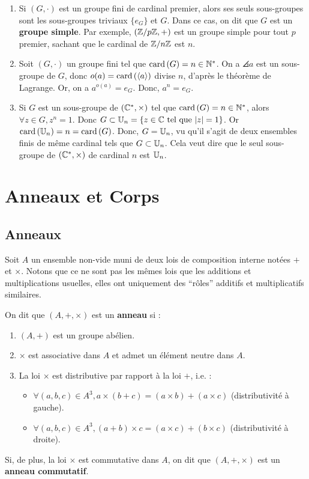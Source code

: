 \documentclass[12pt, a4paper]{report}
\begin{document}
\begin{consequence}
    \begin{enumerate}
        \item Si $(G,\cdot)$ est un groupe fini de cardinal premier, alors ses seuls sous-groupes sont les sous-groupes triviaux $\{e_G\}$ et $G$. Dans ce cas, on dit que $G$ est un \textbf{groupe simple}. Par exemple, $(\mathbb{Z}/p\mathbb{Z},+)$ est un groupe simple pour tout $p$ premier, sachant que le cardinal de $\mathbb{Z}/n\mathbb{Z}$ est $n$.
        \item Soit $(G,\cdot)$ un groupe fini tel que $\mathrm{card}\left(G\right)=n\in\mathbb{N}^*$. On a $\angles{a}$ est un sous-groupe de $G$, donc $o(a)=\mathrm{card}\left(\left\langle a\right\rangle\right)$ divise $n$, d'après le théorème de Lagrange. Or, on a $a^{o(a)}=e_G$. Donc, $a^n = e_G$.
        \item Si $G$ est un sous-groupe de $(\mathbb{C}^*,\times)$ tel que $\mathrm{card}\left(G\right)=n\in\mathbb{N}^*$, alors $\forall z \in G, z^n = 1$. Donc $G\subset \mathbb{U}_n = \{z \in \mathbb{C} \text{ tel que } |z|=1\}$. Or $\mathrm{card}\left(\mathbb{U}_n\right) = n = \mathrm{card}\left(G\right)$. Donc, $G = \mathbb{U}_n$, vu qu'il s'agit de deux ensembles finis de même cardinal tels que $G \subset \mathbb{U}_n$. Cela veut dire que le seul sous-groupe de $(\mathbb{C}^*,\times)$ de cardinal $n$ est $\mathbb{U}_n$.
    \end{enumerate}
\end{consequence}

\chapter{Anneaux et Corps}

\section{Anneaux}

\begin{definition}[Anneau]
    Soit $A$ un ensemble non-vide muni de deux lois de composition interne notées $+$ et $\times$. Notons que ce ne sont pas les mêmes lois que les additions et multiplications usuelles, elles ont uniquement des ``rôles'' additifs et multiplicatifs similaires.

    On dit que $(A,+,\times)$ est un \textbf{anneau} si :
    \begin{enumerate}
        \item $(A,+)$ est un groupe abélien.
        \item $\times$ est associative dans $A$ et admet un élément neutre dans $A$.
        \item La loi $\times$ est distributive par rapport à la loi $+$, i.e. :
        \begin{itemize}
            \item $\forall (a,b,c) \in A^3, a \times (b + c) = (a \times b) + (a \times c)$ (distributivité à gauche).
            \item $\forall (a,b,c) \in A^3, (a + b) \times c = (a \times c) + (b \times c)$ (distributivité à droite).
        \end{itemize}
    \end{enumerate}

    Si, de plus, la loi $\times$ est commutative dans $A$, on dit que $(A,+,\times)$ est un \textbf{anneau commutatif}.
\end{definition}
\end{document}
